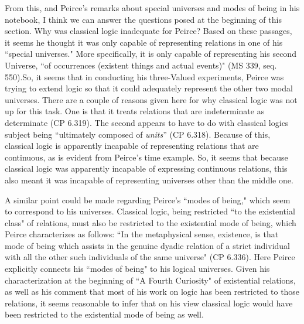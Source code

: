 \documentclass[12pt]{article}
\begin{document}
From this, and Peirce's remarks about special universes and modes of being in his notebook, I think we can answer the questions posed at the beginning of this section. Why was classical logic inadequate for Peirce? Based on these passages, it seems he thought it was only capable of representing relations in one of his ``special universes." More specifically, it is only capable of representing his second Universe, ``of occurrences (existent things and actual events)" (MS 339, seq. 550).So, it seems that in conducting his three-Valued experiments, Peirce was trying to extend logic so that it could adequately represent the other two modal universes. There are a couple of reasons given here for why classical logic was not up for this task. One is that it treats relations that are indeterminate as determinate (CP 6.319). The second appears to have to do with classical logics subject being ``ultimately composed of \textit{units}” (CP 6.318). Because of this, classical logic is apparently incapable of representing relations that are continuous, as is evident from Peirce's time example. So, it seems that because classical logic was apparently incapable of expressing continuous relations, this also meant it was incapable of representing universes other than the middle one.

A similar point could be made regarding Peirce's ``modes of being," which seem to correspond to his universes. Classical logic, being restricted ``to the existential class" of relations, must also be restricted to the existential mode of being, which Peirce characterizes as follows: ``In the metaphysical sense, existence, is that mode of being which assists in the genuine dyadic relation of a strict individual with all the other such individuals of the same universe" (CP 6.336). Here Peirce explicitly connects his ``modes of being" to his logical universes. Given his characterization at the beginning of  ``A Fourth Curiosity" of existential relations, as well as his comment that most of his work on logic has been restricted to those relations, it seems reasonable to infer that on his view classical logic would have been restricted to the existential mode of being as well. 
\end{document}
